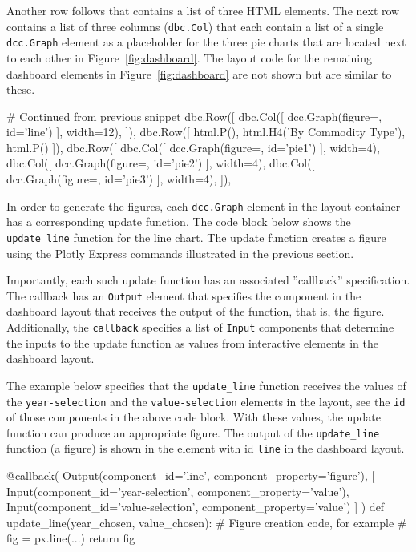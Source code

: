 \begin{withcode}
Another row follows that contains a list of three HTML elements. The next row contains a list of three columns (\texttt{dbc.Col}) that each contain a list of a single \texttt{dcc.Graph} element as a placeholder for the three pie charts that are located next to each other in Figure~\ref{fig:dashboard}. The layout code for the remaining dashboard elements in Figure~\ref{fig:dashboard} are not shown but are similar to these.

\begin{pythoncode}
# Continued from previous snippet
   dbc.Row([
        dbc.Col([
            dcc.Graph(figure={}, id='line')
        ], width=12),
    ]),
    dbc.Row([
        html.P(),
        html.H4('By Commodity Type'),
        html.P()
    ]),
    dbc.Row([
        dbc.Col([
            dcc.Graph(figure={}, id='pie1')
        ], width=4),
        dbc.Col([
            dcc.Graph(figure={}, id='pie2')
        ], width=4),
        dbc.Col([
            dcc.Graph(figure={}, id='pie3')
        ], width=4),
    ]),
\end{pythoncode}

In order to generate the figures, each \texttt{dcc.Graph} element in the layout container has a corresponding update function. The code block below shows the \texttt{update\_line} function for the line chart. The update function creates a figure using the Plotly Express commands illustrated in the previous section.

Importantly, each such update function has an associated ''callback'' specification. The callback has an \texttt{Output} element that specifies the component in the dashboard layout that receives the output of the function, that is, the figure. Additionally, the \texttt{callback} specifies a list of \texttt{Input} components that determine the inputs to the update function as values from interactive elements in the dashboard layout. 

The example below specifies that the \texttt{update\_line} function receives the values of the \texttt{year-selection} and the \texttt{value-selection} elements in the layout, see the \texttt{id} of those components in the above code block. With these values, the update function can produce an appropriate figure. The output of the \texttt{update\_line} function (a figure) is shown in the element with id \texttt{line} in the dashboard layout. 

\begin{pythoncode}
@callback(
    Output(component_id='line', component_property='figure'),
    [
        Input(component_id='year-selection', 
              component_property='value'),
        Input(component_id='value-selection', 
              component_property='value')
    ]
)
def update_line(year_chosen, value_chosen): 
    # Figure creation code, for example
    # fig = px.line(...)
    return fig
\end{pythoncode}


\end{withcode}
